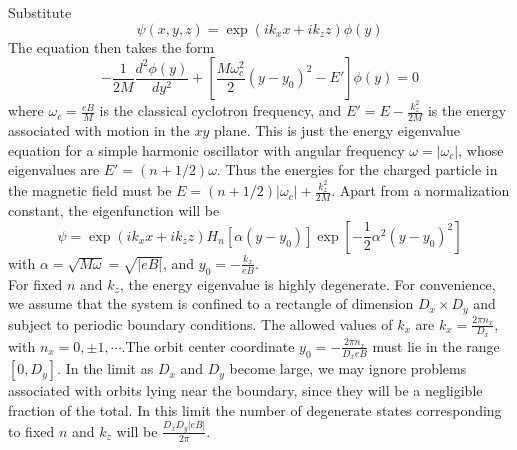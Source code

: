\documentclass[cyan]{elegantnote}
\begin{document}
Substitute
\[\psi(x,y,z) = \exp(ik_xx+ik_zz)\phi(y)\]
The equation then takes the form
\[-\frac{1}{2M} \frac{d^2\phi(y)}{dy^2} + \left[ \frac{M\omega_c^2}{2}(y-y_0)^2-E' \right]\phi(y) = 0\]
where $\omega_c = \frac{eB}{M}$ is the classical cyclotron frequency, and $E'=E-\frac{k_z^2}{2M}$ is the energy associated with motion in the $xy$ plane. This is just the energy eigenvalue equation for a simple harmonic oscillator with angular frequency $\omega = |\omega_c|$, whose eigenvalues are $E' = (n+1/2)\omega$. Thus the energies for the charged particle in the magnetic field must be $E = (n+1/2)|\omega_c|+\frac{k_z^2}{2M}$. Apart from a normalization constant, the eigenfunction will be
\[\psi = \exp(ik_xx+ik_zz) H_n[\alpha(y-y_0)]\exp[-\frac{1}{2}\alpha^2 (y-y_0)^2]\]
with $\alpha = \sqrt{M\omega} = \sqrt{|eB|}$, and $y_0 = - \frac{k_x}{eB}$.\\
For fixed $n$ and $k_z$, the energy eigenvalue is highly degenerate. For convenience, we assume that the system is confined to a rectangle of dimension $D_x\times D_y$ and subject to periodic boundary conditions. The allowed
values of $k_x$ are $k_x = \frac{2\pi n_x}{D_x}$, with $n_x = 0,\pm1,\cdots$.The orbit center coordinate $y_0 = -\frac{2\pi n_x}{D_xeB}$ must lie in the range $[0,D_y]$. In the limit as $D_x$ and $D_y$ become large, we may ignore problems associated with orbits lying near the boundary, since they will be a negligible fraction of the total. In this limit the number of degenerate states corresponding to fixed $n$ and $k_z$ will be $\frac{D_xD_y |eB|}{2\pi}$.
\end{document}
